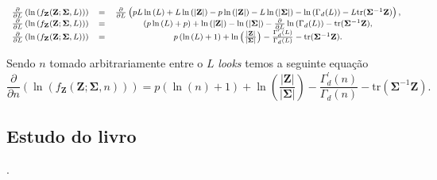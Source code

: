 \documentclass[12pt,a4paper]{article}
\begin{document}
\begin{equation}\label{eqn116}
	{\footnotesize
\begin{array}{ccc}
	\frac{\partial}{\partial L}\left(\ln{\left(f_{\mathbf{Z}}(\mathbf{Z};\mathbf{\Sigma},L)\right)}\right)&=&\frac{\partial}{\partial L}\left(pL\ln{\left(L\right)}+L\ln{\left( |\mathbf{Z}|\right)}-p\ln{\left( |\mathbf{Z}|\right)} - L \ln{\left(|\mathbf{\Sigma}|\right)}-\ln{\left(\Gamma_d(L)\right)}-L\mathrm{tr}{(\mathbf{\Sigma}^{-1}\mathbf{Z})}\right), \\
	\frac{\partial}{\partial L}\left(\ln{\left(f_{\mathbf{Z}}(\mathbf{Z};\mathbf{\Sigma},L)\right)}\right)&=&\left(p\ln{\left(L\right)}+p\right)+\ln{\left( |\mathbf{Z}|\right)} - \ln{\left(|\mathbf{\Sigma}|\right)}-\frac{\partial}{\partial L}\ln{\left(\Gamma_d(L)\right)}-\mathrm{tr}{(\mathbf{\Sigma}^{-1}\mathbf{Z})}, \\
	\frac{\partial}{\partial L}\left(\ln{\left(f_{\mathbf{Z}}(\mathbf{Z};\mathbf{\Sigma},L)\right)}\right)&=&p\left(\ln{\left(L\right)}+1\right)+\ln{\left(\frac{|\mathbf{Z}|}{|\mathbf{\Sigma|}}\right)}-\frac{\Gamma^{\prime}_d(L)}{\Gamma_d(L)}-\mathrm{tr}{(\mathbf{\Sigma}^{-1}\mathbf{Z})}. \\
\end{array}}
\end{equation}

Sendo $n$ tomado arbitrariamente entre o $L$ {\it looks} temos a seguinte equação
\begin{equation}\label{eqn117}
	\frac{\partial}{\partial n}\left(\ln{\left(f_{\mathbf{Z}}(\mathbf{Z};\mathbf{\Sigma},n)\right)}\right)=p\left(\ln{\left(n\right)}+1\right)+\ln{\left(\frac{|\mathbf{Z}|}{|\mathbf{\Sigma|}}\right)}-\frac{\Gamma^{\prime}_d(n)}{\Gamma_d(n)}-\mathrm{tr}{(\mathbf{\Sigma}^{-1}\mathbf{Z})}. 
\end{equation}


\subsection{Estudo do livro  \cite{lee2009polarimetric}}.
\end{document}
